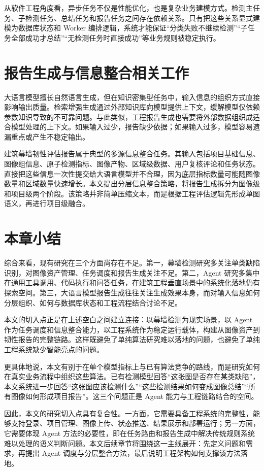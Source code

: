 从软件工程角度看，异步任务不仅是性能优化，也是复杂业务建模方式。检测主任务、子检测任务、总结任务和报告任务之间存在依赖关系。只有把这些关系显式建模为数据库状态和 Worker 编排逻辑，系统才能保证“分类失败不继续检测”“子任务全部成功才总结”“无检测任务时直接成功”等业务规则被稳定执行。

\section{报告生成与信息整合相关工作}
\label{sec:related-report-generation}

大语言模型擅长自然语言生成，但在知识密集型任务中，输入信息的组织方式直接影响输出质量。检索增强生成通过外部知识库向模型提供上下文，缓解模型仅依赖参数知识导致的不可靠问题\cite{lewis2020rag}。与此类似，工程报告生成也需要将外部数据组织成适合模型处理的上下文。如果输入过少，报告缺少依据；如果输入过多，模型容易遗漏重点或产生不稳定输出。

建筑幕墙韧性评估报告属于典型的多源信息整合任务。其输入包括项目基础信息、图像组信息、原子检测指标、图像产物、区域级数据、用户复核评论和任务状态。直接把这些信息一次性提交给大语言模型并不合理，因为底层指标数量可能随图像数量和区域数量快速增长。本文提出分层信息整合策略，将报告生成拆分为图像级和项目级两个阶段。该策略并非简单压缩文本，而是根据工程评估逻辑先形成单图语义，再进行项目级融合。

\section{本章小结}
\label{sec:related-gap}

综合来看，现有研究在三个方面尚存在不足。第一，幕墙检测研究多关注单类缺陷识别，对图像资产管理、任务调度和报告生成关注不足。第二，Agent 研究多集中在通用工具调用、代码执行和问答任务，在建筑工程垂直场景中的系统化落地仍有探索空间。第三，大语言模型报告生成往往关注生成效果本身，而对输入信息如何分层组织、如何与数据库状态和工程流程结合讨论不足。

本文的切入点正是在上述空白之间建立连接：以幕墙检测为现实场景，以 Agent 作为任务调度和信息整合能力，以工程系统作为稳定运行载体，构建从图像资产到韧性报告的完整链路。这样既避免了单纯算法研究难以落地的问题，也避免了单纯工程系统缺少智能亮点的问题。

更具体地说，本文有别于在单个模型指标上与已有算法竞争的路线，而是研究如何在真实业务流程中组织这些算法。已有检测模型回答“这张图是否存在某类缺陷”，本文系统进一步回答“这张图应该检测什么”“这些检测结果如何变成图像总结”“所有图像如何形成项目报告”。这三个问题正是 Agent 能力与工程链路结合的空间。

因此，本文的研究切入点具有复合性。一方面，它需要具备工程系统的完整性，能够支持登录、项目管理、图像上传、状态推送、结果展示和部署运行；另一方面，它需要体现 Agent 方法的必要性，即在任务路由和报告生成中解决传统规则系统难以处理的语义判断问题。本文后续章节将围绕这一主线展开：先定义问题和需求，再提出 Agent 调度与分层整合方法，最后说明工程架构如何支撑该方法落地。
